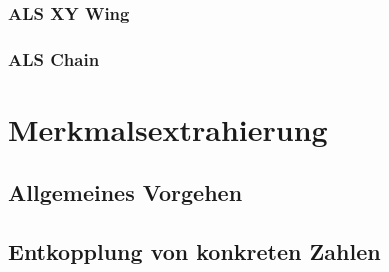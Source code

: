 \documentclass[accentcolor=tud6b,11pt,paper=a4]{tudreport}
\begin{document}
\subsection{ALS XY Wing}
\subsection{ALS Chain}


\chapter{Merkmalsextrahierung}
\section{Allgemeines Vorgehen}
\section{Entkopplung von konkreten Zahlen}
\end{document}
